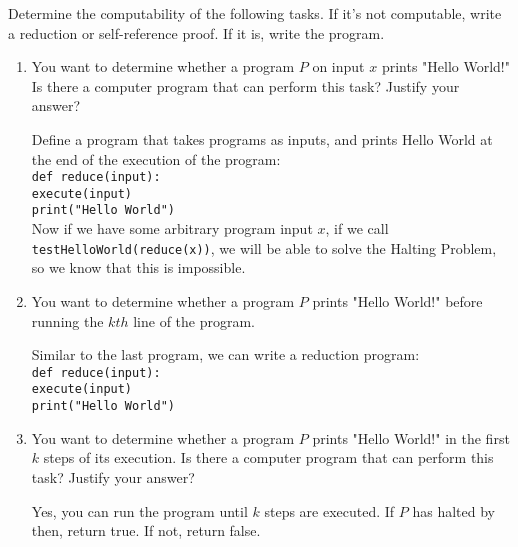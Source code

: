 \question Determine the computability of the following tasks. If it's not computable, write a reduction or self-reference proof. If it is, write the program.\\
\begin {enumerate}
\item You want to determine whether a program $P$ on input $x$ prints "Hello World!" Is there a computer program that can perform this task? Justify your answer? \\
\begin{solution}[.3 in]
Define a program that takes programs as inputs, and prints Hello World at the end of the execution of the program:
\\
\texttt{def reduce(input):}\\
\hphantom{xyz}\texttt{execute(input)}\\
\hphantom{xyz}\texttt{print("Hello World")}\\
Now if we have some arbitrary program input $x$, if we call \\
\texttt{testHelloWorld(reduce(x))}, we will be able to solve the Halting Problem, so we know that this is impossible.\\
\end{solution}
\item You want to determine whether a program $P$ prints "Hello World!" before running the $kth$ line of the program.
\begin{solution}[.3 in]
Similar to the last program, we can write a reduction program:\\
\texttt{def reduce(input):}\\
\hphantom{xyz}\texttt{execute(input)}\\
\hphantom{xyz}\texttt{print("Hello World")}\\
\end{solution}
\item You want to determine whether a program $P$ prints "Hello World!" in the first $k$ steps of its execution. Is there a computer program that can perform this task? Justify your answer?\\
\begin{solution} [.1 in]
Yes, you can run the program until $k$ steps are executed. If $P$ has halted by then, return true. If not, return false.
\end{solution}
\end{enumerate}

